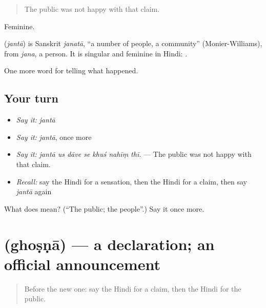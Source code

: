 \begin{quote}
The public was not happy with that claim.
\end{quote}

Feminine.

\begin{cousinweb}
\textbf{} (\emph{jantā}) is Sanskrit \emph{janatā}, \textquotedblleft{}a number of people, a community\textquotedblright{} (Monier-Williams), from \emph{jana}, a person. It is singular and feminine in Hindi: \textbf{   }.
\end{cousinweb}

\begin{grammarlens}[title={What you've built}]
One more word for telling what happened.
\end{grammarlens}

\subsection*{Your turn}
\begin{itemize}
\raggedright
  \item \emph{Say it:} \emph{jantā}
  \item \emph{Say it:} \emph{jantā}, once more
  \item \emph{Say it:} \emph{jantā us dāve se khuś nahīṃ thī.} — The public was not happy with that claim.
  \item \emph{Recall:} say the Hindi for a sensation, then the Hindi for a claim, then say \emph{jantā} again
\end{itemize}

\begin{tcolorbox}[breakable,colback=teal!4,colframe=teal!35!black,title={Before you move on}]
What does  mean? (\textquotedblleft{}The public; the people\textquotedblright{}.) Say it once more.
\end{tcolorbox}
\section[\texorpdfstring{\hi{घोषणा} (ghoṣṇā)}{घोषणा (ghoṣṇā)}]{ (ghoṣṇā) — a declaration; an official announcement}

\label{lesson:HI-C315-ghosna}



\begin{quote}
Before the new one: say the Hindi for a claim, then the Hindi for the public.
\end{quote}

